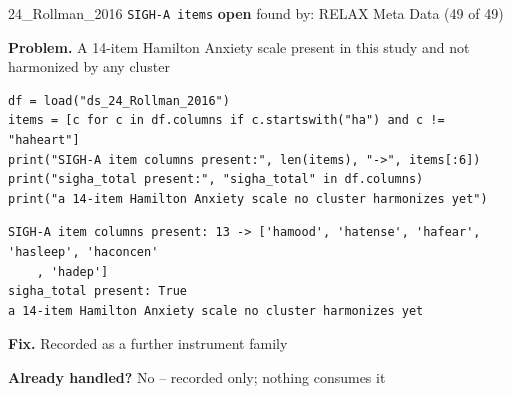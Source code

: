 \documentclass[9pt, t, handout]{beamer}
\newcommand{\ans}[1]{\textcolor{structure.fg}{#1}}
\begin{document}
\begin{frame}[fragile]{24\_Rollman\_2016 \quad \texttt{SIGH-A items}}
  {\scriptsize\textcolor{purple!70!black}{\textbf{open}} \quad
   found by: RELAX Meta Data \quad (49 of 49)}
  \vspace{3pt}

  {\footnotesize \textbf{Problem.} A 14-item Hamilton Anxiety scale present in this study and not harmonized by any cluster}
  \vspace{4pt}

  \begin{Verbatim}[fontsize=\tiny, frame=single, framesep=2pt, label=\tiny reproduce]
df = load("ds_24_Rollman_2016")
items = [c for c in df.columns if c.startswith("ha") and c != "haheart"]
print("SIGH-A item columns present:", len(items), "->", items[:6])
print("sigha_total present:", "sigha_total" in df.columns)
print("a 14-item Hamilton Anxiety scale no cluster harmonizes yet")
  \end{Verbatim}
  \begin{Verbatim}[fontsize=\tiny, frame=single, framesep=2pt, label=\tiny output]
SIGH-A item columns present: 13 -> ['hamood', 'hatense', 'hafear', 'hasleep', 'haconcen'
    , 'hadep']
sigha_total present: True
a 14-item Hamilton Anxiety scale no cluster harmonizes yet
  \end{Verbatim}
  \vspace{2pt}

  {\footnotesize \textbf{Fix.} Recorded as a further instrument family}
  \vspace{2pt}

  {\footnotesize \textbf{Already handled?} \ans{No} -- recorded only; nothing consumes it
   }
\end{frame}
\end{document}
